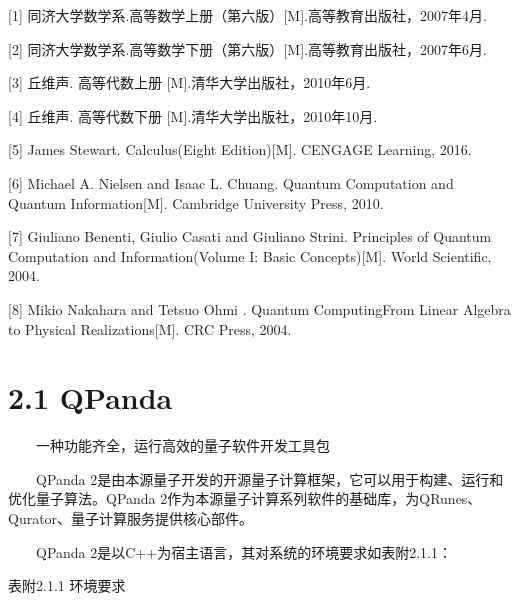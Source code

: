 \documentclass[a4paper,11pt,english]{sphinxmanual}
\begin{document}
\sphinxAtStartPar
{}

\sphinxAtStartPar
{[}1{]} 同济大学数学系.高等数学\sphinxhyphen{}上册（第六版）{[}M{]}.高等教育出版社，2007年4月.

\sphinxAtStartPar
{[}2{]} 同济大学数学系.高等数学\sphinxhyphen{}下册（第六版）{[}M{]}.高等教育出版社，2007年6月.

\sphinxAtStartPar
{[}3{]} 丘维声. 高等代数\sphinxhyphen{}上册 {[}M{]}.清华大学出版社，2010年6月.

\sphinxAtStartPar
{[}4{]} 丘维声. 高等代数\sphinxhyphen{}下册 {[}M{]}.清华大学出版社，2010年10月.

\sphinxAtStartPar
{[}5{]} James Stewart. Calculus(Eight Edition){[}M{]}. CENGAGE Learning, 2016.

\sphinxAtStartPar
{[}6{]} Michael A. Nielsen and Isaac L. Chuang. Quantum Computation and Quantum Information{[}M{]}. Cambridge University Press, 2010.

\sphinxAtStartPar
{[}7{]} Giuliano Benenti, Giulio Casati and Giuliano Strini. Principles of Quantum Computation and Information(Volume I: Basic Concepts){[}M{]}. World Scientific, 2004.

\sphinxAtStartPar
{[}8{]} Mikio Nakahara and Tetsuo Ohmi . Quantum Computing\sphinxhyphen{}From Linear Algebra to Physical Realizations{[}M{]}. CRC Press, 2004.

\sphinxstepscope


\section{2.1 QPanda}
\label{\detokenize{rst/_u9644_u5f552_u91cf_u5b50_u7f16_u7a0b_u5de5_u5177_u7684_u5b89_u88c5_u4e0e_u914d_u7f6e:qpanda}}\label{\detokenize{rst/_u9644_u5f552_u91cf_u5b50_u7f16_u7a0b_u5de5_u5177_u7684_u5b89_u88c5_u4e0e_u914d_u7f6e::doc}}
\sphinxAtStartPar
​  一种功能齐全，运行高效的量子软件开发工具包

\sphinxAtStartPar
​  QPanda 2是由本源量子开发的开源量子计算框架，它可以用于构建、运行和优化量子算法。QPanda 2作为本源量子计算系列软件的基础库，为QRunes、Qurator、量子计算服务提供核心部件。

\sphinxAtStartPar
{}

\sphinxAtStartPar
​  QPanda 2是以C++为宿主语言，其对系统的环境要求如表附2.1.1：

\begin{center}表附2.1.1 环境要求
\end{center}
\end{document}
